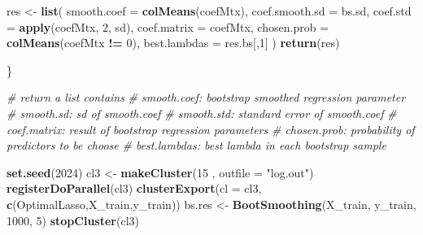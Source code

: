 \documentclass[
]{article}
\newenvironment{Shaded}{\begin{snugshade}}{\end{snugshade}}
\newcommand{\AttributeTok}[1]{\textcolor[rgb]{0.13,0.29,0.53}{#1}}
\newcommand{\CommentTok}[1]{\textcolor[rgb]{0.56,0.35,0.01}{\textit{#1}}}
\newcommand{\DecValTok}[1]{\textcolor[rgb]{0.00,0.00,0.81}{#1}}
\newcommand{\FunctionTok}[1]{\textcolor[rgb]{0.13,0.29,0.53}{\textbf{#1}}}
\newcommand{\NormalTok}[1]{#1}
\newcommand{\OtherTok}[1]{\textcolor[rgb]{0.56,0.35,0.01}{#1}}
\newcommand{\SpecialCharTok}[1]{\textcolor[rgb]{0.81,0.36,0.00}{\textbf{#1}}}
\newcommand{\StringTok}[1]{\textcolor[rgb]{0.31,0.60,0.02}{#1}}
\begin{document}
\begin{Shaded}
\begin{Highlighting}[]
\NormalTok{    res }\OtherTok{\textless{}{-}} \FunctionTok{list}\NormalTok{(}
        \AttributeTok{smooth.coef =} \FunctionTok{colMeans}\NormalTok{(coefMtx),}
        \AttributeTok{coef.smooth.sd =}\NormalTok{ bs.sd,}
        \AttributeTok{coef.std =} \FunctionTok{apply}\NormalTok{(coefMtx, }\DecValTok{2}\NormalTok{, sd),}
        \AttributeTok{coef.matrix =}\NormalTok{ coefMtx,}
        \AttributeTok{chosen.prob =} \FunctionTok{colMeans}\NormalTok{(coefMtx }\SpecialCharTok{!=} \DecValTok{0}\NormalTok{),}
        \AttributeTok{best.lambdas =}\NormalTok{ res.bs[,}\DecValTok{1}\NormalTok{]}
\NormalTok{    )}
    \FunctionTok{return}\NormalTok{(res)}
    
\NormalTok{\}}

\CommentTok{\# return a list contains}
\CommentTok{\# smooth.coef: bootstrap smoothed regression parameter}
\CommentTok{\# smooth.sd: sd of smooth.coef}
\CommentTok{\# smooth.std: standard error of smooth.coef}
\CommentTok{\# coef.matrix: result of bootstrap regression parameters}
\CommentTok{\# chosen.prob: probability of predictors to be choose}
\CommentTok{\# best.lambdas: best lambda in each bootstrap sample}
\end{Highlighting}
\end{Shaded}

\begin{Shaded}
\begin{Highlighting}[]
\FunctionTok{set.seed}\NormalTok{(}\DecValTok{2024}\NormalTok{)}
\NormalTok{cl3 }\OtherTok{\textless{}{-}} \FunctionTok{makeCluster}\NormalTok{(}\DecValTok{15}\NormalTok{ , }\AttributeTok{outfile =} \StringTok{"log.out"}\NormalTok{)}
\FunctionTok{registerDoParallel}\NormalTok{(cl3)}
\FunctionTok{clusterExport}\NormalTok{(}\AttributeTok{cl =}\NormalTok{ cl3, }\FunctionTok{c}\NormalTok{(}\StringTok{\textquotesingle{}OptimalLasso\textquotesingle{}}\NormalTok{,}\StringTok{\textquotesingle{}X\_train\textquotesingle{}}\NormalTok{,}\StringTok{\textquotesingle{}y\_train\textquotesingle{}}\NormalTok{))}
\NormalTok{bs.res }\OtherTok{\textless{}{-}} \FunctionTok{BootSmoothing}\NormalTok{(X\_train, y\_train, }\DecValTok{1000}\NormalTok{, }\DecValTok{5}\NormalTok{)}
\FunctionTok{stopCluster}\NormalTok{(cl3)}
\end{Highlighting}
\end{Shaded}
\end{document}

